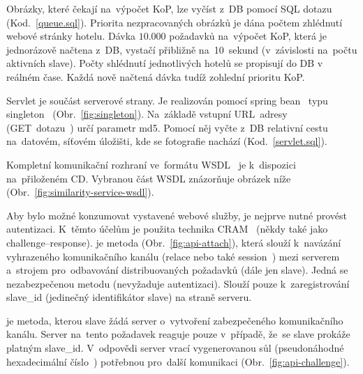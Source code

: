 Obrázky, které čekají na~výpočet KoP, lze vyčíst z~DB pomocí SQL dotazu (Kod.~\ref{queue.sql}). Priorita nezpracovaných obrázků je dána počtem zhlédnutí webové stránky hotelu. Dávka $ 10.000 $ požadavků na~výpočet KoP, která je jednorázově načtena z~DB, vystačí přibližně na~10~sekund (v~závislosti na~počtu aktivních slave). Počty shlédnutí jednotlivých hotelů se propisují do DB v reálném čase. Každá nově načtená dávka tudíž zohlední prioritu KoP.


Servlet je součást serverové strany. Je realizován pomocí spring bean~\cite{bean} typu singleton~\cite{SpringInAction} (Obr.~\ref{fig:singleton}). Na~základě vstupní URL~adresy~\cite{url} (GET~dotazu~\cite{get}) určí parametr md5. Pomocí něj vyčte z~DB relativní cestu na~datovém, síťovém úložišti, kde se fotografie nachází (Kod.~\ref{servlet.sql}).


Kompletní komunikační rozhraní ve~formátu WSDL~\cite{wsdl} je k~dispozici na~přiloženém CD. Vybranou část WSDL znázorňuje obrázek níže (Obr.~\ref{fig:similarity-service-wsdl}).


Aby bylo možné konzumovat vystavené webové služby, je nejprve nutné provést autentizaci. K~těmto účelům je použita technika CRAM~\cite{challenge-response} (někdy také jako challenge--response).
je metoda (Obr.~\ref{fig:api-attach}), která slouží k~navázání vyhrazeného komunikačního kanálu (relace nebo také session~\cite{session}) mezi serverem a~strojem pro~odbavování distribuovaných požadavků (dále jen slave). Jedná se nezabezpečenou metodu (nevyžaduje autentizaci). Slouží pouze k~zaregistrování slave\_id (jedinečný identifikátor slave) na straně serveru.


je metoda, kterou slave žádá server o~vytvoření zabezpečeného komunikačního kanálu. Server na~tento požadavek reaguje pouze v~případě, že~se slave prokáže platným slave\_id. V~odpovědi server vrací vygenerovanou sůl (pseudonáhodné hexadecimální číslo~\cite{hash}) potřebnou pro~další komunikaci (Obr.~\ref{fig:api-challenge}).

